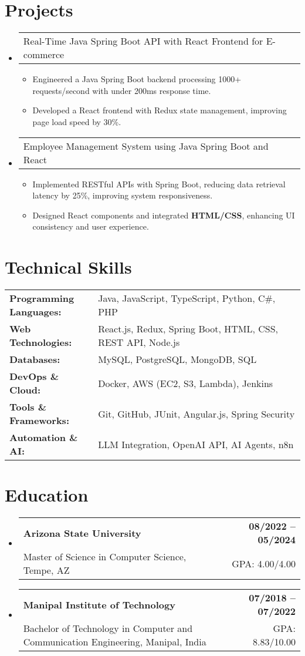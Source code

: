 \documentclass[letterpaper,11pt]{article}
\makeatletter
\newcommand{\resumeItem}[1]{
  \item\footnotesize{
    {#1 \vspace{-2pt}}
  }
}
\newcommand{\educationSubheading}[4]{
  \vspace{-2pt}\item
    \begin{tabular*}{1.0\textwidth}[t]{l@{\extracolsep{\fill}}r}
      \textbf{\small #1} & \textbf{\small #2} \\
      {\small#3} & {\small #4} \\
    \end{tabular*}\vspace{-7pt}
}
\newcommand{\resumeProjectHeading}[2]{
    \item
    \begin{tabular*}{1.001\textwidth}{l@{\extracolsep{\fill}}r}
      \small#1 & \textbf{\small #2}\\
    \end{tabular*}\vspace{-7pt}
}
\newcommand{\resumeSubHeadingListStart}{\begin{itemize}[leftmargin=0pt, label={}]}
\newcommand{\resumeSubHeadingListEnd}{\end{itemize}}
\newcommand{\resumeItemListStart}{\begin{itemize}[leftmargin=*]}
\newcommand{\resumeItemListEnd}{\end{itemize}\vspace{-5pt}}
\makeatother
\begin{document}
\section{Projects}
    \vspace{-5pt}
    \resumeSubHeadingListStart
      \resumeProjectHeading
          {Real-Time Java Spring Boot API with React Frontend for E-commerce}{}
          \resumeItemListStart
              \resumeItem{Engineered a Java Spring Boot backend processing 1000+ requests/second with under 200ms response time.}
              \resumeItem{Developed a React frontend with Redux state management, improving page load speed by 30\%.}
          \resumeItemListEnd
          \vspace{-16pt}
      \resumeProjectHeading
          {Employee Management System using Java Spring Boot and React}{}
          \resumeItemListStart
              \resumeItem{Implemented RESTful APIs with Spring Boot, reducing data retrieval latency by 25\%, improving system responsiveness.}
              \resumeItem{Designed React components and integrated \textbf{HTML/CSS}, enhancing UI consistency and user experience.}
          \resumeItemListEnd
    \resumeSubHeadingListEnd
\vspace{-10pt}
\section{Technical Skills}
        \vspace{-14pt}
        \begin{table}[h]
            \footnotesize
            \begin{tabular}{p{0.3\linewidth} p{0.7\linewidth}}
                \textbf{Programming Languages:} & Java, JavaScript, TypeScript, Python, C\#, PHP \\
                \textbf{Web Technologies:} & React.js, Redux, Spring Boot, HTML, CSS, REST API, Node.js \\
                \textbf{Databases:} & MySQL, PostgreSQL, MongoDB, SQL \\
                \textbf{DevOps \& Cloud:} & Docker, AWS (EC2, S3, Lambda), Jenkins \\
                \textbf{Tools \& Frameworks:} & Git, GitHub, JUnit, Angular.js, Spring Security \\
                \textbf{Automation \& AI:} & LLM Integration, OpenAI API, AI Agents, n8n \\
            \end{tabular}
        \end{table}

 \vspace{-15pt}

\section{Education}
  \resumeSubHeadingListStart
    \educationSubheading
      {Arizona State University}{08/2022 -- 05/2024}
      {Master of Science in Computer Science, Tempe, AZ}{GPA: 4.00/4.00}

    \educationSubheading
      {Manipal Institute of Technology}{07/2018 -- 07/2022}
      {Bachelor of Technology in Computer and Communication Engineering, Manipal, India}{GPA: 8.83/10.00}
  \resumeSubHeadingListEnd
\end{document}
